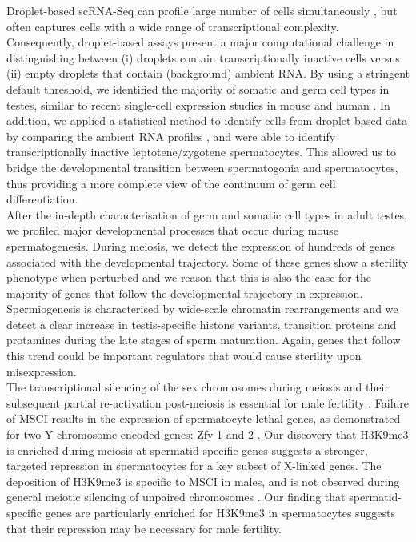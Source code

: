 Droplet-based scRNA-Seq can profile large number of cells simultaneously \citep{Klein2015, Macosko2015, Zheng2017}, but often captures cells with a wide range of transcriptional complexity. Consequently, droplet-based assays present a major computational challenge in distinguishing between (i) droplets contain transcriptionally inactive cells versus (ii) empty droplets that contain (background) ambient RNA. By using a stringent default threshold, we identified the majority of somatic and germ cell types in testes, similar to recent single-cell expression studies in mouse and human \citep{Lukassen2018, Xia2018, Chen2018}. In addition, we applied a statistical method to identify cells from droplet-based data by comparing the ambient RNA profiles \citep{Lun2018}, and were able to identify transcriptionally inactive leptotene/zygotene spermatocytes. This allowed us to bridge the developmental transition between spermatogonia and spermatocytes, thus providing a more complete view of the continuum of germ cell differentiation.\\

After the in-depth characterisation of germ and somatic cell types in adult testes, we profiled major developmental processes that occur during mouse spermatogenesis. During meiosis, we detect the expression of hundreds of genes associated with the developmental trajectory. Some of these genes show a sterility phenotype when perturbed and we reason that this is also the case for the majority of genes that follow the developmental trajectory in expression. Spermiogenesis is characterised by wide-scale chromatin rearrangements and we detect a clear increase in testis-specific histone variants, transition proteins and protamines during the late stages of sperm maturation. Again, genes that follow this trend could be important regulators that would cause sterility upon misexpression.   \\

The transcriptional silencing of the sex chromosomes during meiosis and their subsequent partial re-activation post-meiosis is essential for male fertility \citep{Mahadevaiah2008}. Failure of \gls{MSCI} results in the expression of spermatocyte-lethal genes, as demonstrated for two Y chromosome encoded genes: \gls{Zfy} 1 and 2 \citep{Royo2010}. Our discovery that H3K9me3 is enriched during meiosis at spermatid-specific genes suggests a stronger, targeted repression in spermatocytes for a key subset of X-linked genes. The deposition of H3K9me3 is specific to MSCI in males, and is not observed during general meiotic silencing of unpaired chromosomes \citep{Cloutier2016, Taketo2013, Turner2004a}. Our finding that spermatid-specific genes are particularly enriched for H3K9me3 in spermatocytes suggests that their repression may be necessary for male fertility. \\

